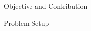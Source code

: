 \documentclass[final]{beamer}
\newlength{\onecolwid}
\begin{document}
\begin{frame}[t]
\begin{columns}[t]
\begin{column}{\onecolwid}
\begin{alertblock}{Objective and Contribution}
%


\end{alertblock}

\vskip -1cm
\begin{block}{Problem Setup}
\vskip -1cm


\end{block}
\end{column}
\end{columns}
\end{frame}
\end{document}

